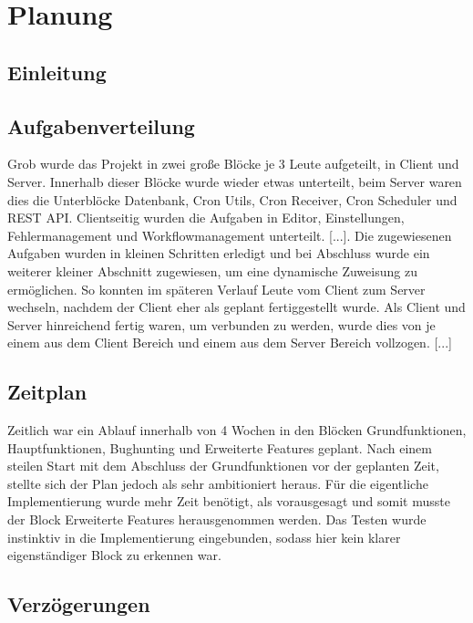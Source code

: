 \chapter{Planung}
    
    \section{Einleitung}
    
    \section{Aufgabenverteilung}
    \begin{flushleft}
    Grob wurde das Projekt in zwei große Blöcke je 3 Leute aufgeteilt, in Client und Server. Innerhalb dieser Blöcke wurde wieder etwas unterteilt, beim Server waren dies die Unterblöcke Datenbank, Cron Utils, Cron Receiver, Cron Scheduler und REST API. Clientseitig wurden die Aufgaben in Editor, Einstellungen, Fehlermanagement und Workflowmanagement unterteilt. [...]. Die zugewiesenen Aufgaben wurden in kleinen Schritten erledigt und bei Abschluss wurde ein weiterer kleiner Abschnitt zugewiesen, um eine dynamische Zuweisung zu ermöglichen. So konnten im späteren Verlauf Leute vom Client zum Server wechseln, nachdem der Client eher als geplant fertiggestellt wurde. Als Client und Server hinreichend fertig waren, um verbunden zu werden, wurde dies von je einem aus dem Client Bereich und einem aus dem Server Bereich vollzogen. [...]
    \end{flushleft}
    
    \section{Zeitplan}
    Zeitlich war ein Ablauf innerhalb von 4 Wochen in den Blöcken Grundfunktionen, Hauptfunktionen, Bughunting und Erweiterte Features geplant. Nach einem steilen Start mit dem Abschluss der Grundfunktionen vor der geplanten Zeit, stellte sich der Plan jedoch als sehr ambitioniert heraus. Für die eigentliche Implementierung wurde mehr Zeit benötigt, als vorausgesagt und somit musste der Block Erweiterte Features herausgenommen werden. Das Testen wurde instinktiv in die Implementierung eingebunden, sodass hier kein klarer eigenständiger Block zu erkennen war. 
    
    \section{Verzögerungen}

